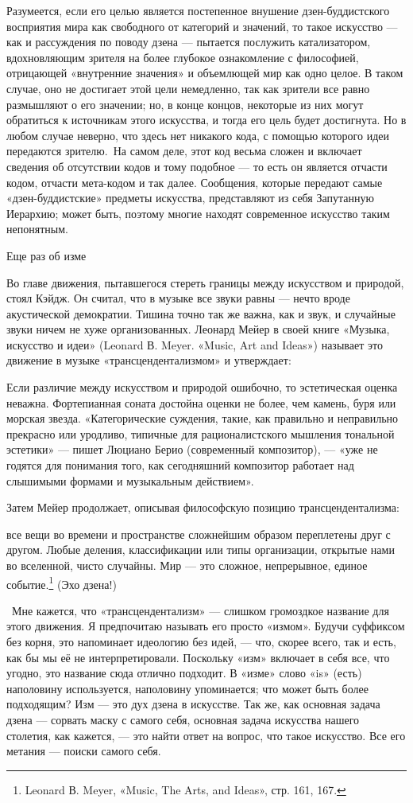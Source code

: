 \documentclass[../main.tex]{subfiles}
\begin{document}
Разумеется, если его целью является постепенное внушение дзен-буддистского восприятия мира как свободного от категорий и значений, то такое искусство --- как и рассуждения по поводу дзена --- пытается послужить катализатором, вдохновляющим зрителя на более глубокое ознакомление с философией, отрицающей «внутренние значения» и объемлющей мир как одно целое. В таком случае, оно не достигает этой цели немедленно, так как зрители все равно размышляют о его значении; но, в конце концов, некоторые из них могут обратиться к источникам этого искусства, и тогда его цель будет достигнута. Но в любом случае неверно, что здесь нет никакого кода, с помощью которого идеи передаются зрителю.~На самом деле, этот код весьма сложен и включает сведения об отсутствии кодов и тому подобное --- то есть он является отчасти кодом, отчасти мета-кодом и так далее. Сообщения, которые передают самые «дзен-буддистские» предметы искусства, представляют из себя Запутанную Иерархию; может быть, поэтому многие находят современное искусство таким непонятным.

Еще раз об изме

Во главе движения, пытавшегося стереть границы между искусством и природой, стоял Кэйдж. Он считал, что в музыке все звуки равны --- нечто вроде акустической демократии. Тишина точно так же важна, как и звук, и случайные звуки ничем не хуже организованных. Леонард Мейер в своей книге «Музыка, искусство и идеи» (Leonard В. Meyer. «Music, Art and Ideas») называет это движение в музыке «трансцендентализмом» и утверждает:

Если различие между искусством и природой ошибочно, то эстетическая оценка неважна. Фортепианная соната достойна оценки не более, чем камень, буря или морская звезда. «Категорические суждения, такие, как правильно и неправильно прекрасно или уродливо, типичные для рационалистского мышления тональной эстетики» --- пишет Люциано Берио (современный композитор), --- «уже не годятся для понимания того, как сегодняшний композитор работает над слышимыми формами и музыкальным действием».

Затем Мейер продолжает, описывая философскую позицию трансцендентализма:

все вещи во времени и пространстве сложнейшим образом переплетены друг с другом. Любые деления, классификации или типы организации, открытые нами во вселенной, чисто случайны. Мир --- это сложное, непрерывное, единое событие.\footnote{Leonard В. Meyer, «Music, The Arts, and Ideas», стр. 161, 167.} (Эхо дзена!)

~Мне кажется, что «трансцендентализм» --- слишком громоздкое название для этого движения. Я предпочитаю называть его просто «измом». Будучи суффиксом без корня, это напоминает идеологию без идей, --- что, скорее всего, так и есть, как бы мы её не интерпретировали. Поскольку «изм» включает в себя все, что угодно, это название сюда отлично подходит. В «изме» слово «is» (есть) наполовину используется, наполовину упоминается; что может быть более подходящим? Изм --- это дух дзена в искусстве. Так же, как основная задача дзена --- сорвать маску с самого себя, основная задача искусства нашего столетия, как кажется, --- это найти ответ на вопрос, что такое искусство. Все его метания --- поиски самого себя.
\end{document}
